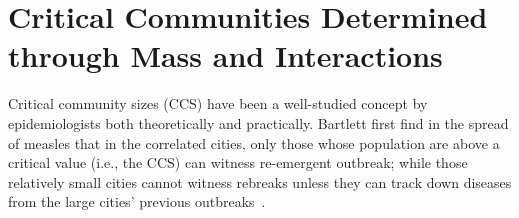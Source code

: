 \section{Critical Communities Determined through Mass and Interactions}

Critical community sizes (CCS) have been a well-studied concept by epidemiologists both theoretically and practically. Bartlett first find in the spread of measles that in the correlated cities, only those whose population are above a critical value (i.e., the CCS) can witness re-emergent outbreak; while those relatively small cities cannot witness rebreaks unless they can track down diseases from the large cities' previous outbreaks~\cite{1960The}. 